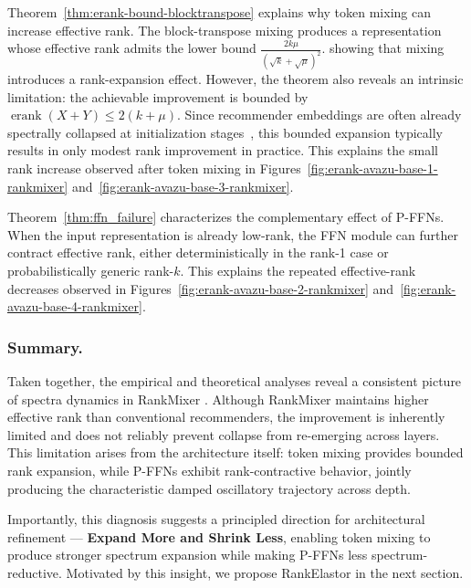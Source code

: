 \documentclass[sigconf,screen]{acmart}
\newcommand{\unimixer}{RankElastor }
\newcommand{\rankmixer}{RankMixer }
\begin{document}
Theorem~\ref{thm:erank-bound-blocktranspose} explains why token mixing can increase effective rank. 
The block-transpose mixing produces a representation whose effective rank admits the lower bound
\(
\frac{2k\mu}{(\sqrt{k}+\sqrt{\mu})^2}.
\)
showing that mixing introduces a rank-expansion effect. 
However, the theorem also reveals an intrinsic limitation: the achievable improvement is bounded by
\(
\operatorname{erank}(X+Y)\le 2(k+\mu).
\)
Since recommender embeddings are often already spectrally collapsed at initialization stages~\cite{embedding-collapse-1-multiembedding,embedding-collapse-2,embedding-collapse-5}, this bounded expansion typically results in only modest rank improvement in practice. 
This explains the small rank increase observed after token mixing in Figures~\ref{fig:erank-avazu-base-1-rankmixer} and~\ref{fig:erank-avazu-base-3-rankmixer}.

Theorem~\ref{thm:ffn_failure} characterizes the complementary effect of P-FFNs. 
When the input representation is already low-rank, the FFN module can further contract effective rank, either deterministically in the rank-1 case or probabilistically generic rank-\(k\). 
This explains the repeated effective-rank decreases observed in Figures~\ref{fig:erank-avazu-base-2-rankmixer} and~\ref{fig:erank-avazu-base-4-rankmixer}.



\subsubsection*{\bf Summary.} Taken together, the empirical and theoretical analyses reveal a consistent picture of spectra dynamics in \rankmixer. 
Although \rankmixer maintains higher effective rank than conventional recommenders, the improvement is inherently limited and does not reliably prevent collapse from re-emerging across layers. 
This limitation arises from the architecture itself: token mixing provides bounded rank expansion, while P-FFNs exhibit rank-contractive behavior, jointly producing the characteristic damped oscillatory trajectory across depth.

Importantly, this diagnosis suggests a principled direction for architectural refinement — \textbf{Expand More and Shrink Less}, enabling token mixing to produce stronger spectrum expansion while making P-FFNs less spectrum-reductive. 
Motivated by this insight, we propose \unimixer in the next section.
\end{document}

